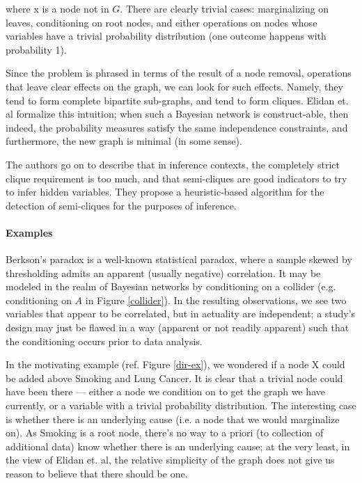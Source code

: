 \documentclass{article}
\begin{document}
	where x is a node not in $G$. There are clearly trivial cases: marginalizing on leaves, conditioning on root nodes, and either operations on nodes whose variables have a trivial probability distribution (one outcome happens with probability 1).
	
	Since the problem is phrased in terms of the result of a node removal, operations that leave clear effects on the graph, we can look for such effects.
	Namely, they tend to form complete bipartite sub-graphs, and tend to form cliques.
	Elidan et. al\cite{elidanDiscovering2001} formalize this intuition; when such a Bayesian network is construct-able, then indeed, the probability measures satisfy the same independence constraints, and furthermore, the new graph is minimal (in some sense).
	
	The authors go on to describe that in inference contexts, the completely strict clique requirement is too much, and that semi-cliques are good indicators to try to infer hidden variables. They propose a heuristic-based algorithm for the detection of semi-cliques for the purposes of inference.
	
	\paragraph{Examples}
	Berkson's paradox is a well-known statistical paradox, where a sample skewed by thresholding admits an apparent (usually negative) correlation.
	It may be modeled in the realm of Bayesian networks by conditioning on a collider (e.g. conditioning on $A$ in Figure \ref{collider}).
	In the resulting observations, we see two variables that appear to be correlated, but in actuality are independent; a study's design may just be flawed in a way (apparent or not readily apparent) such that the conditioning occurs prior to data analysis.
	
	In the motivating example (ref. Figure \ref{dir-ex}), we wondered if a node X could be added above Smoking and Lung Cancer.
	It is clear that a trivial node could have been there --- either a node we condition on to get the graph we have currently, or a variable with a trivial probability distribution.
	The interesting case is whether there is an underlying cause (i.e. a node that we would marginalize on).
	As Smoking is a root node, there's no way to a priori (to collection of additional data) know whether there is an underlying cause; at the very least, in the view of Elidan et. al, the relative simplicity of the graph does not give us reason to believe that there should be one.
	
\end{document}
